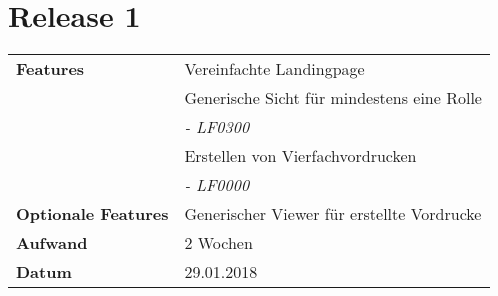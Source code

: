 \section*{Release 1 }
\label{sec:release_1}

\begin{tabular}{p{5cm}p{9cm}}
    \textbf{Features} & Vereinfachte Landingpage \\
    & Generische Sicht für mindestens eine Rolle \\
    & \hspace{8pt} \textit{\footnotesize - LF0300} \\
    & Erstellen von Vierfachvordrucken \\
    & \hspace{8pt} \textit{\footnotesize - LF0000} \\
    \textbf{Optionale Features} & Generischer Viewer für erstellte Vordrucke \\
    \hline
    \textbf{Aufwand} & 2 Wochen \\
    \hline
    \textbf{Datum} & 29.01.2018
\end{tabular}